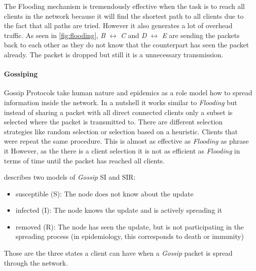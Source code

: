The Flooding mechanism is tremendously effective when the task is to reach all clients in the network because it will find the shortest path to all clients due to the fact that all paths are tried.
However it also generates a lot of overhead traffic. As seen in \vref{fig:flooding}, \textit{B} $\leftrightarrow$ ︎\textit{C} and \textit{D} $\leftrightarrow$ \textit{E} are sending the packets back to each other as they do not know that the counterpart has seen the packet already. The packet is dropped but still it is a unnecessary transmission.

\paragraph{Gossiping}\label{gossiping}
\largepage
Gossip Protocols take human nature and epidemics as a role model how to spread information inside the network. 
In a nutshell it works similar to \textit{Flooding} but instead of sharing a packet with all direct connected clients only a subset is selected where the packet is transmitted to. There are different selection strategies like random selection or selection based on a heuristic. 
Clients that were  repeat the same procedure. This is almost as effective as \textit{Flooding} as \citet{riviere_voulgaris_2011} phrase it 
However, as the there is a client selection it is not as efficient as \textit{Flooding} in terms of time until the packet has reached all clients.

\citet{Jelasity2011} describes two models of \textit{Gossip} SI and SIR:

\begin{itemize}
\item susceptible (S): The node does not know about the update
\item infected (I): The node knows the update and is actively spreading it
\item removed (R): The node has seen the update, but is not participating in the spreading process (in epidemiology, this corresponds to death or immunity)
\end{itemize}
\cite[\S1.2.2]{Jelasity2011}

Those are the three states a client can have when a \textit{Gossip} packet is spread through the network.

